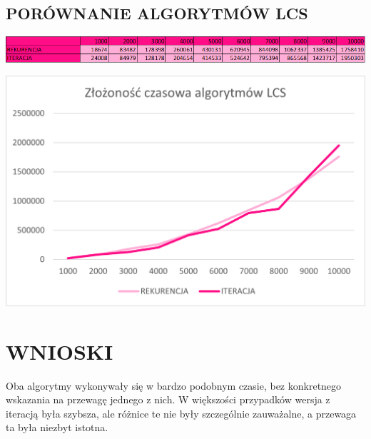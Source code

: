 \documentclass{article}
\begin{document}
	\subsection*{PORÓWNANIE ALGORYTMÓW LCS}
	\begin{center}
		\includegraphics[width = \textwidth]{Obraz6.png}
	\end{center}
	\begin{center}
		\includegraphics[width = \textwidth]{Obraz2.png}
	\end{center}
	\section*{WNIOSKI}
	Oba algorytmy wykonywały się w bardzo podobnym czasie, bez konkretnego wskazania na przewagę jednego z nich. W większości przypadków wersja z iteracją była szybsza, ale różnice te nie były szczególnie zauważalne, a przewaga ta była niezbyt istotna.
\end{document}
